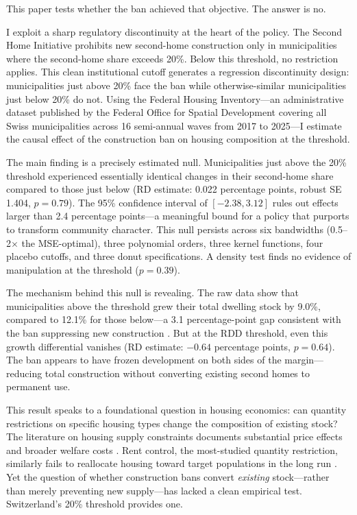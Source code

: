 \documentclass[12pt]{article}
\begin{document}
This paper tests whether the ban achieved that objective. The answer is no.

I exploit a sharp regulatory discontinuity at the heart of the policy. The Second Home Initiative prohibits new second-home construction only in municipalities where the second-home share exceeds 20\%. Below this threshold, no restriction applies. This clean institutional cutoff generates a regression discontinuity design: municipalities just above 20\% face the ban while otherwise-similar municipalities just below 20\% do not. Using the Federal Housing Inventory---an administrative dataset published by the Federal Office for Spatial Development covering all Swiss municipalities across 16 semi-annual waves from 2017 to 2025---I estimate the causal effect of the construction ban on housing composition at the threshold.

The main finding is a precisely estimated null. Municipalities just above the 20\% threshold experienced essentially identical changes in their second-home share compared to those just below (RD estimate: 0.022 percentage points, robust SE 1.404, $p = 0.79$). The 95\% confidence interval of $[-2.38, 3.12]$ rules out effects larger than 2.4 percentage points---a meaningful bound for a policy that purports to transform community character. This null persists across six bandwidths (0.5--2$\times$ the MSE-optimal), three polynomial orders, three kernel functions, four placebo cutoffs, and three donut specifications. A \citet{cattaneo2020} density test finds no evidence of manipulation at the threshold ($p = 0.39$).

The mechanism behind this null is revealing. The raw data show that municipalities above the threshold grew their total dwelling stock by 9.0\%, compared to 12.1\% for those below---a 3.1 percentage-point gap consistent with the ban suppressing new construction \citep[consistent with the price and quantity effects documented by][]{hilber2020}. But at the RDD threshold, even this growth differential vanishes (RD estimate: $-0.64$ percentage points, $p = 0.64$). The ban appears to have frozen development on both sides of the margin---reducing total construction without converting existing second homes to permanent use.

This result speaks to a foundational question in housing economics: can quantity restrictions on specific housing types change the composition of existing stock? The literature on housing supply constraints documents substantial price effects \citep{glaeser2018, saiz2010, hilber2016, turner2014} and broader welfare costs \citep{hsieh2003, ganong2017}. Rent control, the most-studied quantity restriction, similarly fails to reallocate housing toward target populations in the long run \citep{diamond2016, autor2014}. Yet the question of whether construction bans convert \textit{existing} stock---rather than merely preventing new supply---has lacked a clean empirical test. Switzerland's 20\% threshold provides one.
\end{document}
